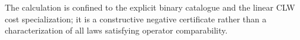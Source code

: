 The calculation is confined to the explicit binary catalogue and the linear CLW cost specialization; it is a constructive negative certificate rather than a characterization of all laws satisfying operator comparability.